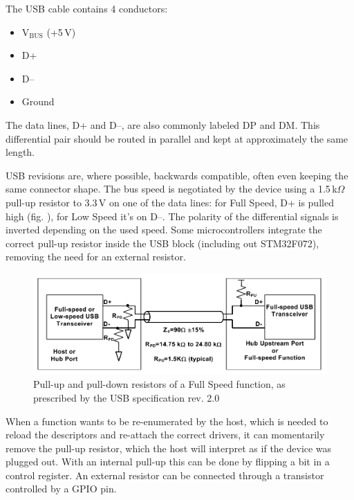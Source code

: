 The USB cable contains 4 conductors:

\begin{itemize}\setlength\itemsep{.2em}
	\item V$_\mathrm{BUS}$ (+5\,V)
	\item D+
	\item D--
	\item Ground
\end{itemize}

The data lines, D+ and D--, are also commonly labeled DP and DM. This differential pair should be routed in parallel and kept at approximately the same length.

USB revisions are, where possible, backwards compatible, often even keeping the same connector shape. The bus speed is negotiated by the device using a 1.5\,k$\Omega$ pull-up resistor to 3.3\,V on one of the data lines: for Full Speed, D+ is pulled high (fig. \label{fig:usb-pullup-fs}), for Low Speed it's on D--. The polarity of the differential signals is inverted depending on the used speed. Some microcontrollers integrate the correct pull-up resistor inside the USB block (including out STM32F072), removing the need for an external resistor.

\begin{figure}
	\centering
	\includegraphics[width=.8\textwidth]{img/usb-pullup-fs.png}
	\caption{\label{fig:usb-pullup-fs}Pull-up and pull-down resistors of a Full Speed function, as prescribed by the USB specification rev. 2.0}
\end{figure}

When a function wants to be re-enumerated by the host, which is needed to reload the descriptors and re-attach the correct drivers, it can momentarily remove the pull-up resistor, which the host will interpret as if the device was plugged out. With an internal pull-up this can be done by flipping a bit in a control register. An external resistor can be connected through a transistor controlled by a GPIO pin. 


